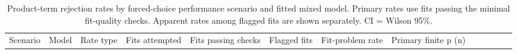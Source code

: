 \documentclass[
  man,
  floatsintext,
  longtable,
  nolmodern,
  notxfonts,
  notimes,
  colorlinks=true,linkcolor=blue,citecolor=blue,urlcolor=blue]{apa7}
\begin{document}
\begin{longtable}[]{@{}
  >{\raggedright\arraybackslash}p{}
  >{\raggedright\arraybackslash}p{}
  >{\raggedright\arraybackslash}p{}
  >{\raggedleft\arraybackslash}p{}
  >{\raggedleft\arraybackslash}p{}
  >{\raggedleft\arraybackslash}p{}
  >{\raggedright\arraybackslash}p{}
  >{\raggedleft\arraybackslash}p{}
  >{\raggedleft\arraybackslash}p{}
  >{\raggedright\arraybackslash}p{}
  >{\raggedleft\arraybackslash}p{}
  >{\raggedleft\arraybackslash}p{}
  >{\raggedright\arraybackslash}p{}@{}}
\caption{Product-term rejection rates by forced-choice performance
scenario and fitted mixed model. Primary rates use fits passing the
minimal fit-quality checks. Apparent rates among flagged fits are shown
separately. CI = Wilson
95\%.}\label{tbl-rejection-forced-choice}\tabularnewline
\toprule\noalign{}
\begin{minipage}[b]{\linewidth}\raggedright
Scenario
\end{minipage} & \begin{minipage}[b]{\linewidth}\raggedright
Model
\end{minipage} & \begin{minipage}[b]{\linewidth}\raggedright
Rate type
\end{minipage} & \begin{minipage}[b]{\linewidth}\raggedleft
Fits attempted
\end{minipage} & \begin{minipage}[b]{\linewidth}\raggedleft
Fits passing checks
\end{minipage} & \begin{minipage}[b]{\linewidth}\raggedleft
Flagged fits
\end{minipage} & \begin{minipage}[b]{\linewidth}\raggedright
Fit-problem rate
\end{minipage} & \begin{minipage}[b]{\linewidth}\raggedleft
Primary finite p (n)
\end{minipage} & \begin{minipage}[b]{\linewidth}\raggedleft

\end{minipage}
\end{longtable}
\end{document}
